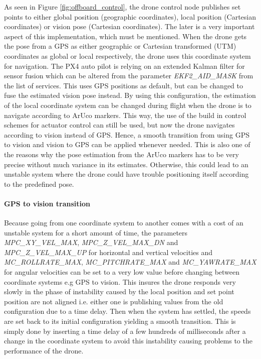 \documentclass[../Head/report.tex]{subfiles}
\begin{document}
As seen in Figure \ref{fig:offboard_control}, the drone control node publishes set points to either global position (geographic coordinates), local position (Cartesian coordinates) or vision pose (Cartesian coordinates). The later is a very important aspect of this implementation, which must be mentioned. When the drone gets the pose from a GPS as either   geographic or Cartesian transformed (UTM) coordinates as global or local respectively, the drone uses this coordinate system for navigation. The PX4 auto pilot is relying on an extended Kalman filter for sensor fusion which can be altered from the parameter \textit{EKF2\_AID\_MASK} from the list of services. This uses GPS positions as default, but can be changed to fuse the estimated vision pose instead. By using this configuration, the estimation of the local coordinate system can be changed during flight when the drone is to navigate according to ArUco markers. This way, the use of the build in control schemes for actuator control can still be used, but now the drone navigates according to vision instead of GPS. Hence, a smooth transition from using GPS to vision and vision to GPS can be applied whenever needed. This is also one of the reasons why the pose estimation from the ArUco markers has to be very precise without much variance in its estimates. Otherwise, this could lead to an unstable system where the drone could have trouble positioning itself according to the predefined pose. 

\paragraph{GPS to vision transition}
\label{sec:gps_to_vision_transition}

Because going from one coordinate system to another comes with a cost of an unstable system for a short amount of time, the parameters \textit{MPC\_XY\_VEL\_MAX}, \textit{MPC\_Z\_VEL\_MAX\_DN} and  \textit{MPC\_Z\_VEL\_MAX\_UP} for horizontal and vertical velocities  and \textit{MC\_ROLLRATE\_MAX}, \textit{MC\_PITCHRATE\_MAX} and \textit{MC\_YAWRATE\_MAX} for angular velocities can be set to a very low value before changing between coordinate systems e.g GPS to vision. This insures the drone responds very slowly in the phase of instability caused by the local position and set point position are not aligned i.e. either one is publishing values from the old configuration due to a time delay. Then when the system has settled, the speeds are set back to its initial configuration yielding a smooth transition. This is simply done by inserting a time delay of a few hundreds of milliseconds after a change in the coordinate system to avoid this instability causing problems to the performance of the drone.
\end{document}
